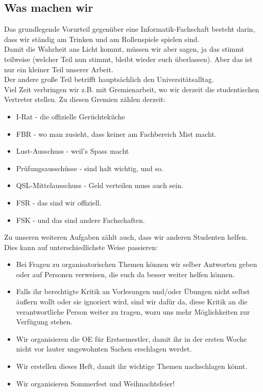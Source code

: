 	\subsection{Was machen wir}
		Das grundlegende Vorurteil gegenüber eine Informatik-Fachschaft besteht darin, dass wir ständig am Trinken und am Rollenspiele spielen sind. \\
		Damit die Wahrheit ans Licht kommt, müssen wir aber sagen, ja das stimmt teilweise (welcher Teil nun stimmt, bleibt wieder euch überlassen). Aber das ist nur ein kleiner Teil unserer Arbeit.\\
		Der andere große Teil betrifft hauptsächlich den Universitätsalltag.\\ Viel Zeit verbringen wir z.B. mit Gremienarbeit, wo wir derzeit die studentischen Vertreter stellen. Zu diesen Gremien zählen derzeit:
		\begin{itemize}
			\item I-Rat - die offizielle Ger\"uchtek\"uche
			\item FBR - wo man zusieht, dass keiner am Fachbereich Mist macht.
			\item Lust-Ausschuss - weil's Spass macht
			\item Prüfungsausschüsse - sind halt wichtig, und so.
			\item QSL-Mittelausschuss - Geld verteilen muss auch sein.
			\item FSR - das sind wir offiziell.
			\item FSK - und das sind andere Fachschaften.
		\end{itemize}
		Zu unseren weiteren Aufgaben zählt auch, dass wir anderen Studenten helfen. Dies kann auf unterschiedlichste Weise passieren:
		\begin{itemize}
			\item Bei Fragen zu organisatorischen Themen können wir selber Antworten geben oder auf Personen verweisen, die euch da besser weiter helfen können.
			\item Falls ihr berechtigte Kritik an Vorlesungen und/oder Übungen nicht selbst äußern wollt oder sie ignoriert wird, sind wir dafür da, diese Kritik an die verantwortliche Person weiter zu tragen, wozu uns mehr Möglichkeiten zur Verfügung stehen.
			\item Wir organisieren die OE für Erstsemestler, damit ihr in der ersten Woche nicht vor lauter ungewohnten Sachen erschlagen werdet.
			\item Wir erstellen dieses Heft, damit ihr wichtige Themen nachschlagen könnt.
			\item Wir organisieren Sommerfest und Weihnachtsfeier!
		\end{itemize}
		
